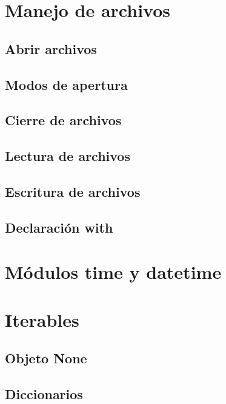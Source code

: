 \documentclass{report}
\begin{document}
\clearpage\chapter{Manejo de archivos}

\section{Abrir archivos}

\section{Modos de apertura}

\section{Cierre de archivos}

\section{Lectura de archivos}

\section{Escritura de archivos}

\section{Declaración with}

\clearpage\chapter{Módulos time y datetime}

\clearpage\chapter{Iterables}

\section{Objeto None}


\section{Diccionarios}
\end{document}
